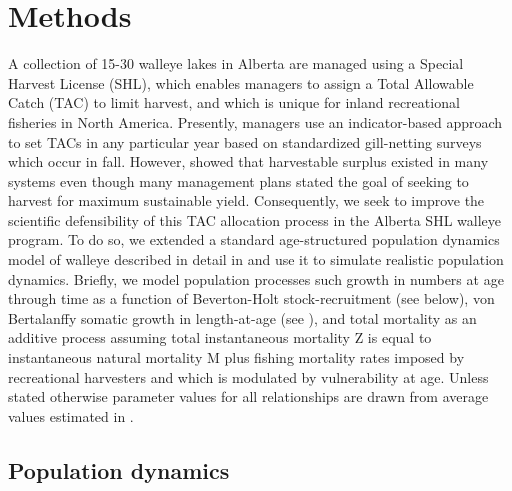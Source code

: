 \documentclass[floatfix,nofootinbib,longbibliography,notitlepage]{revtex4-1}
\begin{document}
%
%
%
\section{Methods}

A collection of 15-30 walleye lakes in Alberta are managed using a Special Harvest License (SHL), which enables managers to assign a Total Allowable Catch (TAC) to limit harvest, and which is unique for inland recreational fisheries in North America.  
Presently, managers use an indicator-based approach to set TACs in any particular year based on standardized gill-netting surveys which occur in fall.  
However, \cite{cahill2022} showed that harvestable surplus existed in many systems even though many management plans stated the goal of seeking to harvest  for maximum sustainable yield.  
Consequently, we seek to improve the scientific defensibility of this TAC allocation process in the Alberta SHL walleye program. 
To do so, we extended a standard age-structured population dynamics model of walleye described in detail in \cite{cahill2022} and use it to simulate realistic population dynamics.  
Briefly, we model population processes such growth in numbers at age through time as a function of Beverton-Holt stock-recruitment (see below), von Bertalanffy somatic growth in length-at-age (see \cite{cahill2020spatial}), and total mortality as an additive process assuming total instantaneous mortality Z is equal to instantaneous natural mortality M plus fishing mortality rates imposed by recreational harvesters and which is modulated by vulnerability at age.  
Unless stated otherwise parameter values for all relationships are drawn from average values estimated in \cite{cahill2020spatial}.

\subsection{Population dynamics}
\end{document}
